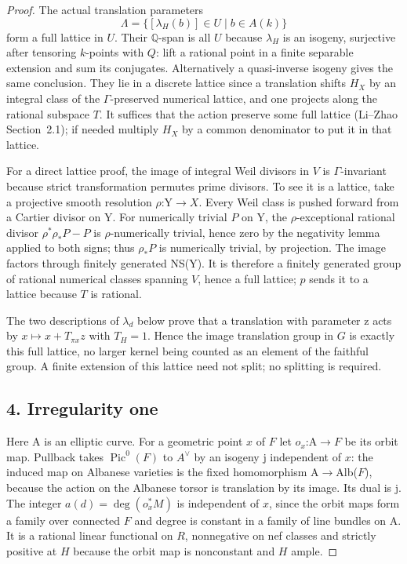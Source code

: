 \documentclass[11pt]{article}
\begin{document}
\begin{proof}
The actual translation parameters \[
 \Lambda=\{[\lambda_H(b)]\in U\mid b\in A(k)\}
\] form a full lattice in \(U\). Their \(\mathbb Q\)-span is all \(U\) because \(\lambda_H\) is an isogeny, surjective after tensoring \(k\)-points with \(Q\): lift a rational point in a finite separable extension and sum its conjugates. Alternatively a quasi-inverse isogeny gives the same conclusion. They lie in a discrete lattice since a translation shifts \(H_X\) by an integral class of the \(\Gamma\)-preserved numerical lattice, and one projects along the rational subspace \(T\). It suffices that the action preserve some full lattice (Li--Zhao Section~2.1); if needed multiply \(H_X\) by a common denominator to put it in that lattice.

For a direct lattice proof, the image of integral Weil divisors in \(V\) is \(\Gamma\)-invariant because
strict transformation permutes prime divisors. To see it is a lattice, take a projective smooth
resolution \(\rho\):Y\(\to X\). Every Weil class is pushed forward from a Cartier divisor on Y. For
numerically trivial \(P\) on Y, the \(\rho\)-exceptional rational divisor \(\rho^*\rho_*P-P\) is
\(\rho\)-numerically trivial, hence zero by the negativity lemma applied to both signs; thus \(\rho_*P\)
is numerically trivial, by projection. The image factors through finitely generated NS(Y). It is
therefore a finitely generated group of rational numerical classes spanning \(V\), hence a full lattice;
\(p\) sends it to a lattice because \(T\) is rational.

The two descriptions of \(\lambda_d\) below prove that a translation with parameter z acts by \(x\mapsto
x+T_{\pi x}z\) with \(T_H=1\). Hence the image translation group in \(G\) is exactly this full lattice,
no larger kernel being counted as an element of the faithful group. A finite extension of this lattice
need not split; no splitting is required.

\subsection*{4. Irregularity one}

Here A is an elliptic curve. For a geometric point \(x\) of \(F\) let \(o_x\):A\(\to F\) be its orbit
map. Pullback takes \(\operatorname{Pic}^0(F)\) to \(A^\vee\) by an isogeny j independent of \(x\): the
induced map on Albanese varieties is the fixed homomorphism A\(\to\)Alb(\(F\)), because the action on the
Albanese torsor is translation by its image. Its dual is j. The integer \(a(d)=\deg(o_x^*M)\) is
independent of \(x\), since the orbit maps form a family over connected \(F\) and degree is constant in a
family of line bundles on A. It is a rational linear functional on \(R\), nonnegative on nef classes and
strictly positive at \(H\) because the orbit map is nonconstant and \(H\) ample.


\end{proof}
\end{document}
